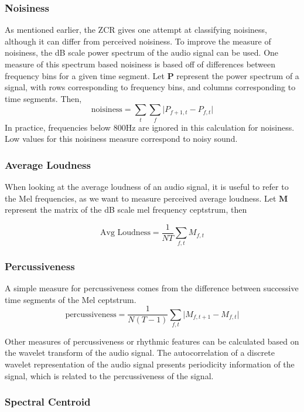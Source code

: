 \documentclass[12pt]{article}
\begin{document}
\subsubsection{Noisiness}

As mentioned earlier, the ZCR gives one attempt at classifying noisiness, although it can differ from perceived noisiness.  To improve the measure of noisiness, the dB scale power spectrum of the audio signal can be used.  One measure of this spectrum based noisiness is based off of differences between frequency bins for a given time segment.  Let $\mathbf{P}$ represent the power spectrum of a signal, with rows corresponding to frequency bins, and columns corresponding to time segments.  Then,
$$ \text{noisiness}  = \sum_{t} \sum_{f} \vert P_{f+1,t} - P_{f,t} \vert $$
In practice, frequencies below 800Hz are ignored in this calculation for noisiness.  Low values for this noisiness measure correspond to noisy sound.

\subsubsection{Average Loudness}

When looking at the average loudness of an audio signal, it is useful to refer to the Mel frequencies, as we want to measure perceived average loudness. Let $\mathbf{M}$ represent the matrix of the dB scale mel frequency ceptstrum, then

$$ \text{Avg Loudness} = \frac{1}{N T} \sum_{f,t} M_{f,t} $$

\subsubsection{Percussiveness}

A simple measure for percussiveness comes from the difference between successive time segments of the Mel ceptstrum.
$$ \text{percussiveness} = \frac{1}{N(T-1)} \sum_{f,t} \vert M_{f,t+1} - M_{f,t}  \vert $$

Other measures of percussiveness or rhythmic features can be calculated based on the wavelet transform of the audio signal.  The autocorrelation of a discrete wavelet representation of the audio signal presents periodicity information of the signal, which is related to the percussiveness of the signal.

\subsubsection{Spectral Centroid}
\end{document}
